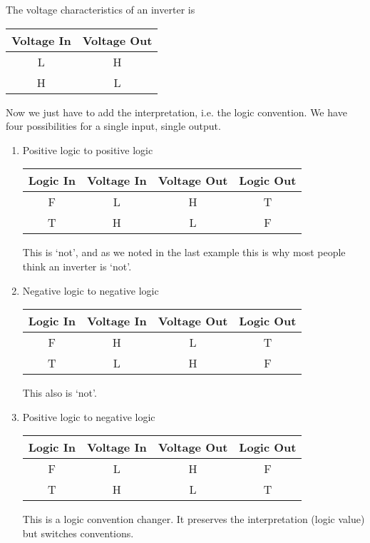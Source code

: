 \begin{example}
The voltage characteristics of an inverter is

\begin{tabular}{cc}
Voltage In & Voltage Out \\\hline
L          & H           \\
H          & L           \\
\end{tabular}

Now we just have to add the interpretation, i.e. the logic convention.  We have four possibilities for a single input, single output.
\begin{enumerate}
\item Positive logic to positive logic

\begin{tabular}{cc||cc}
Logic In & Voltage In & Voltage Out & Logic Out \\\hline
F        & L          & H           & T         \\
T        & H          & L           & F         \\
\end{tabular}

This is `not', and as we noted in the last example this is why most people think an inverter is `not'.

\item Negative logic to negative logic

\begin{tabular}{cc||cc}
Logic In & Voltage In & Voltage Out & Logic Out \\\hline
F        & H          & L           & T         \\
T        & L          & H           & F         \\
\end{tabular}

This also is `not'.

\item Positive logic to negative logic

\begin{tabular}{cc||cc}
Logic In & Voltage In & Voltage Out & Logic Out \\\hline
F        & L          & H           & F         \\
T        & H          & L           & T         \\
\end{tabular}

This is a logic convention changer.  It preserves the interpretation (logic value) but switches conventions.


\end{enumerate}
\end{example}

